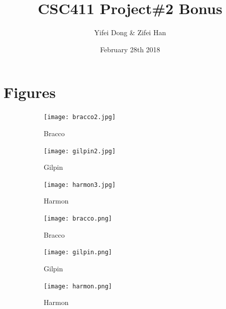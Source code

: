\documentclass{article}
\title{CSC411 Project\#2 Bonus}
\author{Yifei Dong \& Zifei Han}
\date{February 28th 2018}
\begin{document}
\maketitle

\section*{Figures}

\begin{figure}[!ht]
\begin{subfigure}{.35\textwidth}
  \texttt{[image: bracco2.jpg]}
  \caption{Bracco}
  \label{fig:sfig1}
\end{subfigure}
\begin{subfigure}{.35\textwidth}
  \texttt{[image: gilpin2.jpg]}
  \caption{Gilpin}
  \label{fig:sfig2}
\end{subfigure}%
\begin{subfigure}{.35\textwidth}
  \texttt{[image: harmon3.jpg]}
  \caption{Harmon}
  \label{fig:sfig3}
\end{subfigure}
\begin{subfigure}{.35\textwidth}
  \texttt{[image: bracco.png]}
  \caption{Bracco}
  \label{fig:sfig4}
\end{subfigure}%
\begin{subfigure}{.35\textwidth}
  \texttt{[image: gilpin.png]}
  \caption{Gilpin}
  \label{fig:sfig5}
\end{subfigure}
\begin{subfigure}{.35\textwidth}
  \texttt{[image: harmon.png]}
  \caption{Harmon}
  \label{fig:sfig6}%
\end{subfigure}
\caption{}
\label{fig:pcs}
\end{figure}
\end{document}
